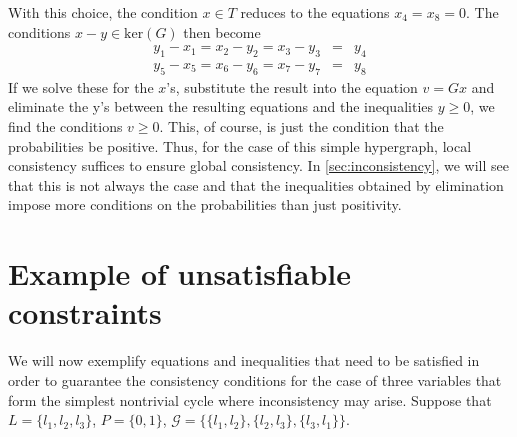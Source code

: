 With this choice, the condition $x \in T$ reduces to the equations
$x_4 = x_8 = 0$.  The conditions $x - y \in \mathrm{ker}(G)$ then
become
\begin{eqnarray}
 y_1 - x_1 = x_2 - y_2 = x_3 - y_3 &=& y_4 \\
 y_5 - x_5 = x_6 - y_6 = x_7 - y_7 &=& y_8
\end{eqnarray}
If we solve these for the $x$'s, substitute the result into the
equation $v = Gx$ and eliminate the y's between the resulting
equations and the inequalities $y \ge 0$, we find the conditions $v
\ge 0$.  This, of course, is just the condition that the probabilities
be positive.  Thus, for the case of this simple hypergraph, local
consistency suffices to ensure global consistency.  In \autoref{sec:inconsistency},
we will see that this is not always the case and that the
inequalities obtained by elimination impose more conditions on the
probabilities than just positivity.

\section{Example of unsatisfiable constraints}\label{sec:inconsistency}
We will now exemplify equations and inequalities that need to be satisfied in order to guarantee the consistency conditions for the case of three variables that form the simplest nontrivial cycle where inconsistency may arise. Suppose that $L = \{l_1,l_2,l_3\}$, $P = \{0,1\}$, $\mathcal{G} = \{\{l_1,l_2\},\{l_2,l_3\},\{l_3,l_1\}\}$.

